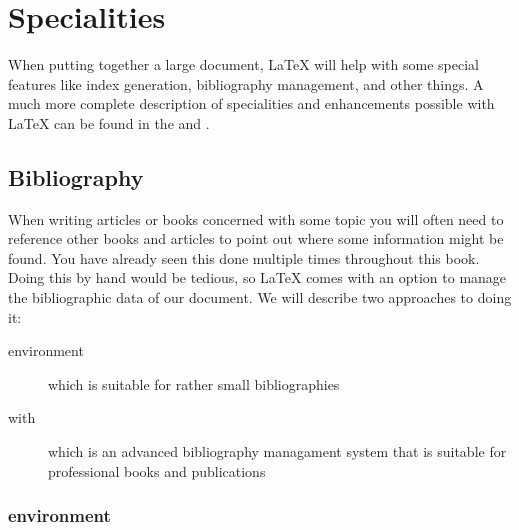 
\chapter{Specialities}
\begin{intro}
  When putting together a large document, \LaTeX{} will help
  with some special features like index generation,
  bibliography management, and other things.
  A much more complete description of specialities and
  enhancements possible with \LaTeX{} can be found in the
  {\normalfont\manual{}} and {\normalfont \companion}.
\end{intro}


\section{Bibliography}

When writing articles or books concerned with some topic you will often need to
reference other books and articles to point out where some information might be
found. You have already seen this done multiple times throughout this book.
Doing this by hand would be tedious, so \LaTeX{} comes with an option to manage
the bibliographic data of our document. We will describe two approaches to
doing it:
\begin{description}
  \item[ environment] which is suitable for rather small
  bibliographies
  \item[ with ] which is an advanced bibliography
  managament system that is suitable for professional books and publications
\end{description}

\subsection{ environment}

